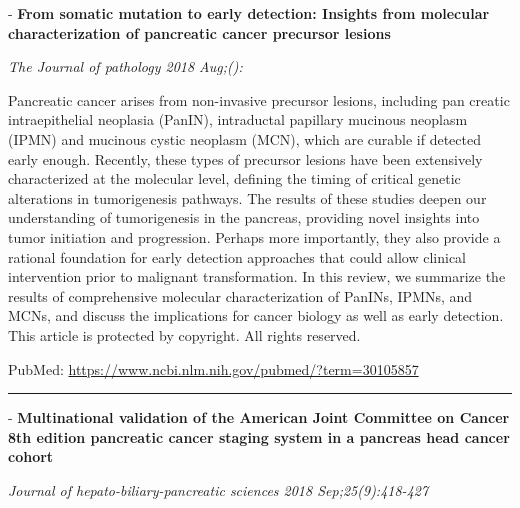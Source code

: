 \documentclass[]{article}
\begin{document}
 - \textbf{From somatic mutation to early detection: Insights from
molecular characterization of pancreatic cancer precursor lesions}

\emph{The Journal of pathology 2018 Aug;():}

Pancreatic cancer arises from non-invasive precursor lesions, including
pan creatic intraepithelial neoplasia (PanIN), intraductal papillary
mucinous neoplasm (IPMN) and mucinous cystic neoplasm (MCN), which are
curable if detected early enough. Recently, these types of precursor
lesions have been extensively characterized at the molecular level,
defining the timing of critical genetic alterations in tumorigenesis
pathways. The results of these studies deepen our understanding of
tumorigenesis in the pancreas, providing novel insights into tumor
initiation and progression. Perhaps more importantly, they also provide
a rational foundation for early detection approaches that could allow
clinical intervention prior to malignant transformation. In this review,
we summarize the results of comprehensive molecular characterization of
PanINs, IPMNs, and MCNs, and discuss the implications for cancer biology
as well as early detection. This article is protected by copyright. All
rights reserved.

PubMed: \url{https://www.ncbi.nlm.nih.gov/pubmed/?term=30105857}

{}

{}

\begin{center}\rule{0.5\linewidth}{\linethickness}\end{center}

 - \textbf{Multinational validation of the American Joint Committee on
Cancer 8th edition pancreatic cancer staging system in a pancreas head
cancer cohort}

\emph{Journal of hepato-biliary-pancreatic sciences 2018
Sep;25(9):418-427}
\end{document}
